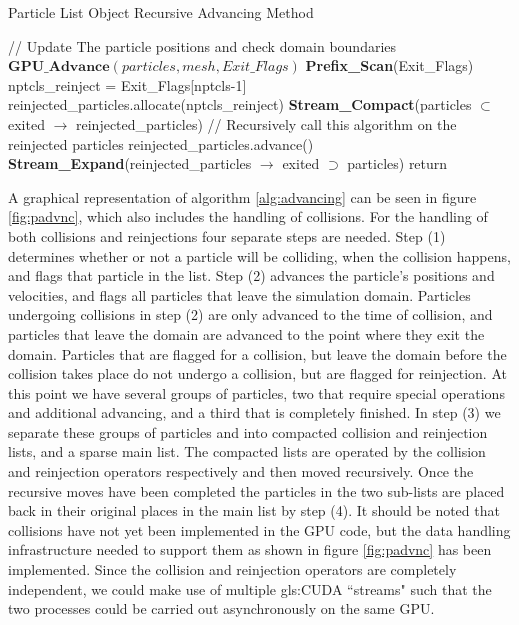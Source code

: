 \begin{algorithm}
	\caption{Particle List Object Recursive Advancing Method}
	\label{alg:advancing}
	\begin{algorithmic}
		\STATE // Update The particle positions and check domain boundaries
		\STATE $\textbf{GPU\_Advance}(particles,mesh,Exit\_Flags)$
		\STATE
		\STATE \textbf{Prefix\_Scan}(Exit\_Flags)
		\STATE
		\STATE nptcls\_reinject = Exit\_Flags[nptcls-1]
		\STATE
			\STATE
			\STATE reinjected\_particles.allocate(nptcls\_reinject)
			\STATE
			\STATE \textbf{Stream\_Compact}(particles $\subset$ exited $\rightarrow$ reinjected\_particles)
			\STATE
			\STATE // Recursively call this algorithm on the reinjected particles
			\STATE reinjected\_particles.advance()
			\STATE
			\STATE \textbf{Stream\_Expand}(reinjected\_particles $\rightarrow$ exited $\supset$ particles)
		\ENDIF
		\STATE
		\STATE return
	\end{algorithmic}
\end{algorithm}

A graphical representation of algorithm \ref{alg:advancing} can be seen in figure \ref{fig:padvnc}, which also includes the handling of collisions. For the handling of both collisions and reinjections four separate steps are needed. Step (1) determines whether or not a particle will be colliding, when the collision happens, and flags that particle in the list. Step (2) advances the particle's positions and velocities, and flags all particles that leave the simulation domain. Particles undergoing collisions in step (2) are only advanced to the time of collision, and particles that leave the domain are advanced to the point where they exit the domain. Particles that are flagged for a collision, but leave the domain before the collision takes place do not undergo a collision, but are flagged for reinjection. At this point we have several groups of particles, two that require special operations and additional advancing, and a third that is completely finished. 
In step (3) we separate these groups of particles and into compacted collision and reinjection lists, and a sparse main list. The compacted lists are operated by the collision and reinjection operators respectively and then moved recursively. 
Once the recursive moves have been completed the particles in the two sub-lists are placed back in their original places in the main list by step (4). It should be noted that collisions have not yet been implemented in the GPU code, but the data handling infrastructure needed to support them as shown in figure \ref{fig:padvnc} has been implemented. 
Since the collision and reinjection operators are completely independent, we could make use of multiple \gls{gls:CUDA} ``streams" such that the two processes could be carried out asynchronously on the same GPU. 

